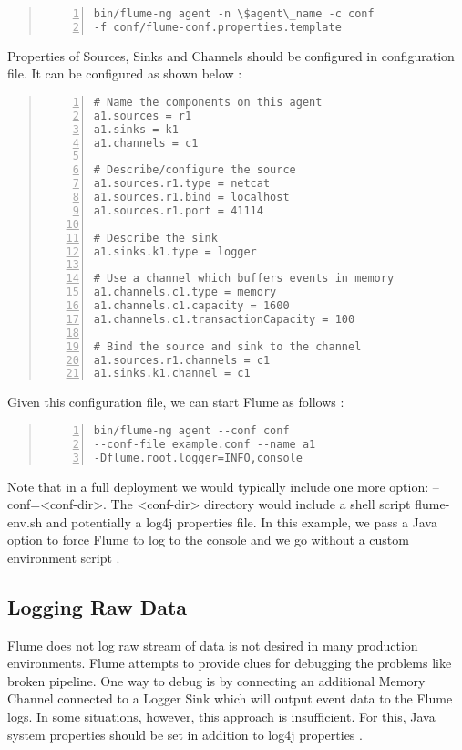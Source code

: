 \documentclass[9pt,twocolumn,twoside]{../../styles/osajnl}
\begin{document}
\begin{quote}
\begin{Verbatim}[numbers=left]
bin/flume-ng agent -n \$agent\_name -c conf 
-f conf/flume-conf.properties.template
\end{Verbatim}
\end{quote}

Properties of Sources, Sinks and Channels should be configured in configuration file. It can be configured as shown below \cite{user-manual}:
\begin{quote}
\begin{Verbatim}[numbers=left]
# Name the components on this agent
a1.sources = r1
a1.sinks = k1
a1.channels = c1

# Describe/configure the source
a1.sources.r1.type = netcat
a1.sources.r1.bind = localhost
a1.sources.r1.port = 41114

# Describe the sink
a1.sinks.k1.type = logger

# Use a channel which buffers events in memory
a1.channels.c1.type = memory
a1.channels.c1.capacity = 1600
a1.channels.c1.transactionCapacity = 100

# Bind the source and sink to the channel
a1.sources.r1.channels = c1
a1.sinks.k1.channel = c1\end{Verbatim}
\end{quote}

Given this configuration file, we can start Flume as follows \cite{user-manual}:
\begin{quote}
\begin{Verbatim}[numbers=left]
bin/flume-ng agent --conf conf 
--conf-file example.conf --name a1 
-Dflume.root.logger=INFO,console
\end{Verbatim}
\end{quote}
Note that in a full deployment we would typically include one more option: --conf=<conf-dir>. The <conf-dir> directory would include a shell script flume-env.sh and potentially a log4j properties file. In this example, we pass a Java option to force Flume to log to the console and we go without a custom environment script \cite{user-manual}.

\subsection{Logging Raw Data}
Flume does not log raw stream of data is not desired in many production environments. Flume attempts to provide clues for debugging the problems like broken pipeline. One way to debug is by connecting an additional Memory Channel connected to a Logger Sink which will output event data to the Flume logs. In some situations, however, this approach is insufficient. For this, Java system properties should be set in addition to log4j properties \cite{user-manual}.
\end{document}
